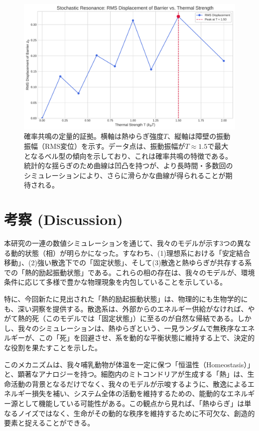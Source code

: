 \documentclass[a4paper,11pt,ja=standard,lualatex]{bxjsarticle}
\begin{document}
\begin{figure}[h!]
  \centering
  \includegraphics[width=0.9\linewidth]{stochastic_resonance_rms_framed.pdf}
  \caption{確率共鳴の定量的証拠。横軸は熱ゆらぎ強度$T$、縦軸は障壁の振動振幅（RMS変位）を示す。データ点は、振動振幅が$T \approx 1.5$で最大となるベル型の傾向を示しており、これは確率共鳴の特徴である。統計的な揺らぎのため曲線は凹凸を持つが、より長時間・多数回のシミュレーションにより、さらに滑らかな曲線が得られることが期待される。}
  \label{fig:SR}
\end{figure}

\FloatBarrier
\section{考察 (Discussion)}
本研究の一連の数値シミュレーションを通じて、我々のモデルが示す3つの異なる動的状態（相）が明らかになった。すなわち、(1)理想系における「安定結合移動」、(2)強い散逸下での「固定状態」、そして(3)散逸と熱ゆらぎが共存する系での「熱的励起振動状態」である。これらの相の存在は、我々のモデルが、環境条件に応じて多様で豊かな物理現象を内包していることを示している。

特に、今回新たに見出された「熱的励起振動状態」は、物理的にも生物学的にも、深い洞察を提供する。散逸系は、外部からのエネルギー供給がなければ、やがて熱的死（このモデルでは「固定状態」）に至るのが自然な帰結である。しかし、我々のシミュレーションは、熱ゆらぎという、一見ランダムで無秩序なエネルギーが、この「死」を回避させ、系を動的な平衡状態に維持する上で、決定的な役割を果たすことを示した。

このメカニズムは、我々哺乳動物が体温を一定に保つ「恒温性（Homeostasis）」と、顕著なアナロジーを持つ。細胞内のミトコンドリアが生成する「熱」は、生命活動の背景となるだけでなく、我々のモデルが示唆するように、散逸によるエネルギー損失を補い、システム全体の活動を維持するための、能動的なエネルギー源として機能している可能性がある。この観点から見れば、「熱ゆらぎ」は単なるノイズではなく、生命がその動的な秩序を維持するために不可欠な、創造的要素と捉えることができる。
\end{document}
